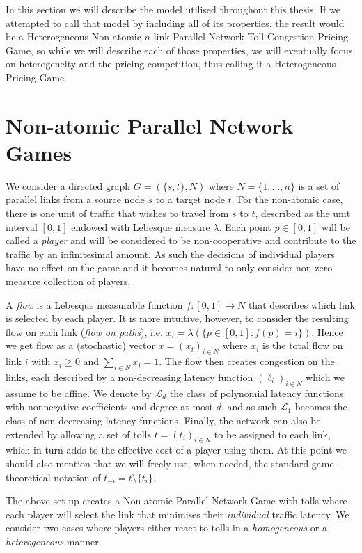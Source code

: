 \documentclass[10pt,a4paper]{book}
\theoremstyle{definition}
\theoremstyle{comment}
\begin{document}
In this section we will describe the model utilised throughout this thesis.
If we attempted to call that model by including all of its properties, the result would be a Heterogeneous Non-atomic $n$-link Parallel Network Toll Congestion Pricing Game, so while we will describe each of those properties, we will eventually focus on heterogeneity and the pricing competition, thus calling it a Heterogeneous Pricing Game.

\section*{Non-atomic Parallel Network Games}

We consider a directed graph $G = (\{s, t\}, N)$ where $N = \{1,\dots, n\}$ is a set of parallel links from a source node $s$ to a target node $t$.
For the non-atomic case, there is one unit of traffic that wishes to travel from $s$ to $t$, described as the unit interval $[0, 1]$ endowed with Lebesque measure $\lambda$.
Each point $p \in [0, 1]$ will be called a \textit{player} and will be considered to be non-cooperative and contribute to the traffic by an infinitesimal amount.
As such the decisions of individual players have no effect on the game and it becomes natural to only consider non-zero measure collection of players.

A \textit{flow} is a Lebesque measurable function $f: [0, 1] \rightarrow N$ that describes which link is selected by each player.
It is more intuitive, however, to consider the resulting flow on each link (\textit{flow on paths}), i.e. $x_i = \lambda(\{p \in [0, 1]: f(p) = i\})$.
Hence we get flow as a (stochastic) vector $x = (x_i)_{i \in N}$ where $x_i$ is the total flow on link $i$ with $x_i \geq 0$ and $\sum_{i \in N}x_i = 1$.
The flow then creates congestion on the links, each described by a non-decreasing latency function $(\ell_i)_{i \in N}$ which we assume to be affine.
We denote by $\mathcal{L}_d$ the class of polynomial latency functions with nonnegative coefficients and degree at most $d$, and as such $\mathcal{L}_1$ becomes the class of non-decreasing latency functions.
Finally, the network can also be extended by allowing a set of tolls $t = (t_i)_{i \in N}$ to be assigned to each link, which in turn adds to the effective cost of a player using them.
At this point we should also mention that we will freely use, when needed, the standard game-theoretical notation of $t_{-i} = t \setminus \{t_i\}$.

The above set-up creates a Non-atomic Parallel Network Game with tolls where each player will select the link that minimises their \textit{individual} traffic latency.
We consider two cases where players either react to tolls in a \textit{homogeneous} or a \textit{heterogeneous} manner.
\end{document}
